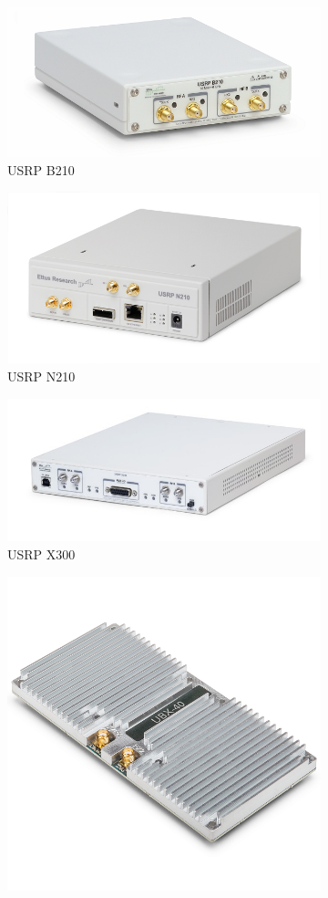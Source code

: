 \begin{figure}[htb]
    \centering
    \begin{subfigure}[htb]{0.45\textwidth}
        \centering
        \includegraphics[width=0.7\linewidth]{figures/b210}
        \caption{USRP B210}
        \label{fig:b210}
    \end{subfigure}
    \begin{subfigure}[htb]{0.45\textwidth}
        \centering
        \includegraphics[width=0.7\linewidth]{figures/n210}
        \caption{USRP N210}
        \label{fig:n210}
    \end{subfigure}
    \begin{subfigure}[htb]{0.5\textwidth}
        \centering
        \includegraphics[width=0.7\linewidth]{figures/x310}
        \caption{USRP X300}
        \label{fig:x300}
    \end{subfigure}
    \begin{subfigure}[htb]{0.4\textwidth}
        \centering
        \includegraphics[width=0.6\linewidth]{figures/UBX40}

\end{subfigure}
\end{figure}
